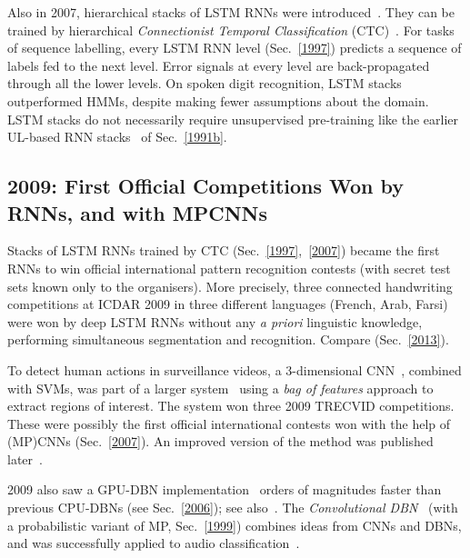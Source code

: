 \documentclass[letterpaper]{article}
\begin{document}
\begin{sloppypar}
Also in 2007, 
hierarchical stacks of LSTM RNNs were introduced~\citep{Santi:07ijcai}. They can be 
trained by hierarchical {\em Connectionist Temporal Classification} (CTC)~\citep{Graves:06icml}. 
For tasks of sequence labelling, 
every LSTM RNN level (Sec.~\ref{1997}) predicts a sequence of labels fed to the next level. 
Error signals at every level are back-propagated through all the
lower levels. On spoken digit recognition, LSTM stacks
outperformed HMMs, despite making fewer assumptions about the domain.
LSTM stacks do not necessarily require unsupervised pre-training
like the earlier UL-based RNN stacks~\citep{chunker91and92} of Sec.~\ref{1991b}.



\subsection{2009: First Official Competitions Won by RNNs, and with MPCNNs}
\label{2009}

Stacks  of LSTM RNNs trained by CTC (Sec.~\ref{1997},~\ref{2007})
 became
the first   RNNs  to win
official international pattern recognition contests (with secret test sets known
only to the organisers). More precisely,
three connected handwriting competitions at ICDAR 2009 in three different languages 
(French, Arab, Farsi) were won by deep
LSTM RNNs without any {\em a priori} linguistic knowledge,
performing simultaneous segmentation and recognition.
Compare
\citep{graves05nn,Graves:09tpami,schmidhuber2011agi,graves:2013icassp,graves2014} (Sec.~\ref{2013}).


To detect human actions in surveillance videos,
a 3-dimensional CNN~\citep[e.g.,][]{seung2009,prokhorov2010}, combined with SVMs, was part of a larger 
system~\citep{trecvid2009}
using a {\em bag of features} approach \citep{nowak2006}
to extract regions of interest.
The system won three 2009 TRECVID competitions.
These were possibly the first official international contests won with the help of (MP)CNNs (Sec.~\ref{2007}).
An improved version of the method was published later~\citep{ji2013}.

2009 also saw a GPU-DBN 
implementation~\citep{raina2009large} orders of magnitudes faster than previous CPU-DBNs
(see Sec.~\ref{2006}); see also~\citep{coates:2013icml}.
The {\em Convolutional DBN}~\citep{lee:2009} (with a probabilistic 
variant of MP, Sec.~\ref{1999})
combines ideas from CNNs and DBNs,
and was successfully applied to audio classification~\citep{lee2009audio}.






\end{sloppypar}
\end{document}
